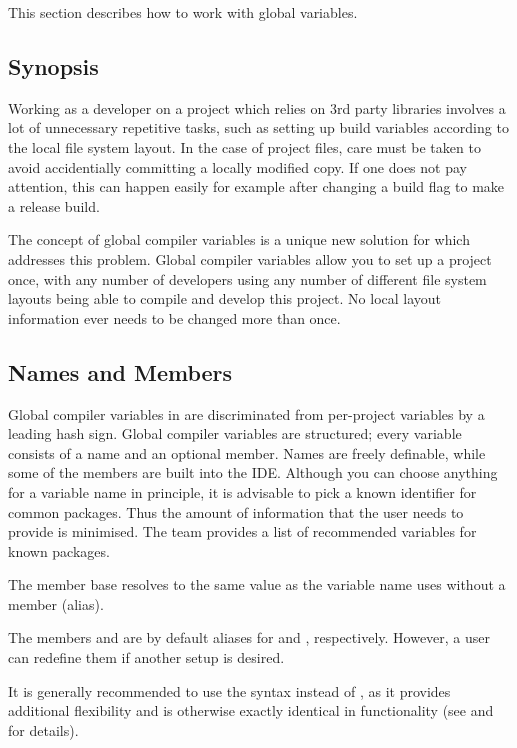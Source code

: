 This section describes how to work with global variables.

\subsection{Synopsis}

Working as a developer on a project which relies on 3rd party libraries involves a lot of unnecessary repetitive tasks, such as setting up build variables according to the local file system layout. In the case of project files, care must be taken to avoid accidentially committing a locally modified copy. If one does not pay attention, this can happen easily for example after changing a build flag to make a release build.

The concept of global compiler variables is a unique new solution for \codeblocks which addresses this problem. Global compiler variables allow you to set up a project once, with any number of developers using any number of different file system layouts being able to compile and develop this project. No local layout information ever needs to be changed more than once.

\subsection{Names and Members}

Global compiler variables in \codeblocks are discriminated from per-project variables by a leading hash sign. Global compiler variables are structured; every variable consists of a name and an optional member. Names are freely definable, while some of the members are built into the IDE. Although you can choose anything for a variable name in principle, it is advisable to pick a known identifier for common packages. Thus the amount of information that the user needs to provide is minimised. The \codeblocks team provides a list of recommended variables for known packages.

The member base resolves to the same value as the variable name uses without a member (alias).

The members  and  are by default aliases for  and , respectively. However, a user can redefine them if another setup is desired.

It is generally recommended to use the syntax  instead of , as it provides additional flexibility and is otherwise exactly identical in functionality (see  and  for details).

